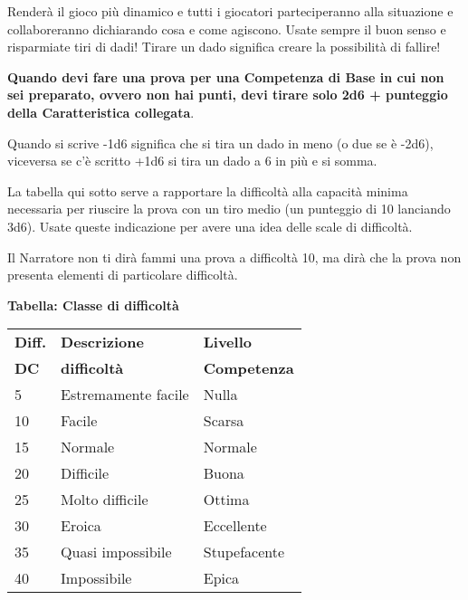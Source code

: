 \begin{multicols}{2}
\begin{changemargin}{0.3cm}{0.3cm}
\begin{narratore}
Renderà il gioco più dinamico e tutti i giocatori parteciperanno alla situazione e collaboreranno dichiarando cosa e come agiscono. Usate sempre il buon senso e risparmiate tiri di dadi! Tirare un dado significa creare la possibilità di fallire!
\end{narratore}\end{changemargin}

%

\medskip

\textbf{Quando devi fare una prova per una Competenza di Base in cui non sei preparato, ovvero non hai punti, devi tirare solo 2d6 + punteggio della Caratteristica collegata}.

Quando si scrive -1d6 significa che si tira un dado in meno (o due se è -2d6), viceversa se c'è scritto +1d6 si tira un dado a 6 in più e si somma.

La tabella qui sotto serve a rapportare la difficoltà alla capacità minima necessaria per riuscire la prova con un tiro medio (un punteggio di 10 lanciando 3d6). Usate queste indicazione per avere una idea delle scale di difficoltà.

Il Narratore non ti dirà fammi una prova a difficoltà 10, ma dirà che la prova non presenta elementi di particolare difficoltà.

%

\medskip

\textbf{Tabella: Classe di difficoltà}\label{basedifficolta}

\medskip

\begin{tabularx}{0.45\textwidth}{lll}
\textbf{Diff.} & \textbf{Descrizione} & \textbf{Livello}\\
\textbf{DC}&\textbf{difficoltà}& \textbf{Competenza}\\
\toprule
5 & Estremamente facile & Nulla\\
10 & Facile & Scarsa\\
15 & Normale & Normale\\
20 & Difficile & Buona\\
25 & Molto difficile & Ottima\\
30 & Eroica& Eccellente\\
35 & Quasi impossibile & Stupefacente\\
40 & Impossibile & Epica
\end{tabularx}


\end{multicols}
